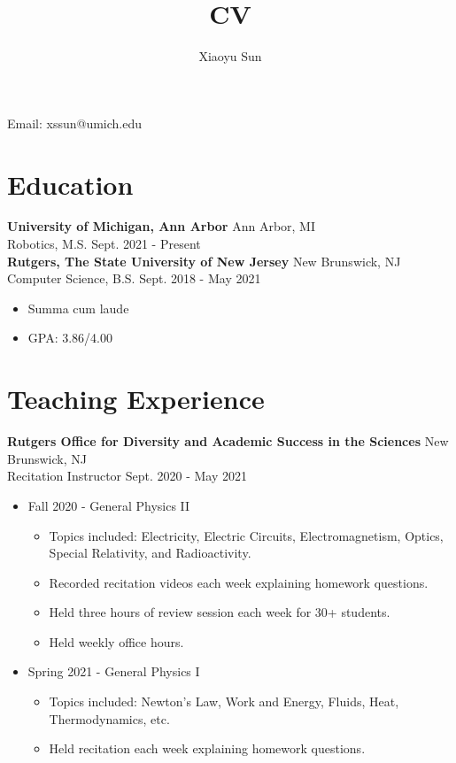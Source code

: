 \documentclass{article}
\makeatletter
\renewcommand{\maketitle}{
\begin{center}
{\huge\bfseries
\theauthor}

\vspace{.25em}

Email: xssun@umich.edu\\
\end{center}
}
\makeatother
\begin{document}
\title{CV}
\author{Xiaoyu Sun}
\maketitle

\section{Education}
\textbf{University of Michigan, Ann Arbor} \space 
\hfill{Ann Arbor, MI}\\
Robotics, M.S.\space
\hfill{Sept. 2021 - Present}\\

\noindent\ignorespacesafterend \textbf{Rutgers, The State University of New Jersey} \space 
\hfill{New Brunswick, NJ}\\
Computer Science, B.S. \space
\hfill{Sept. 2018 - May 2021}
\begin{itemize}
	\item Summa cum laude
	\item GPA: 3.86/4.00
\end{itemize}


\section{Teaching Experience}
\textbf{Rutgers Office for Diversity and Academic Success in the Sciences}
\hfill{New Brunswick, NJ}\\
Recitation Instructor
\hfill{Sept. 2020 - May 2021}
\begin{itemize}
  \item Fall 2020 - General Physics II
  \begin{itemize}
  	\item Topics included: Electricity, Electric Circuits, Electromagnetism, Optics, Special Relativity, and Radioactivity.
     \item Recorded recitation videos each week explaining homework questions.
     \item Held three hours of review session each week for 30+ students.
 	 \item Held weekly office hours.
  \end{itemize}
\end{itemize}
\begin{itemize}
  \item Spring 2021 - General Physics I
  \begin{itemize}
  	\item Topics included: Newton's Law,  Work and Energy,  Fluids,  Heat,  Thermodynamics,  etc.
     \item Held  recitation each week explaining homework questions.
  \end{itemize}
\end{itemize}
\end{document}
